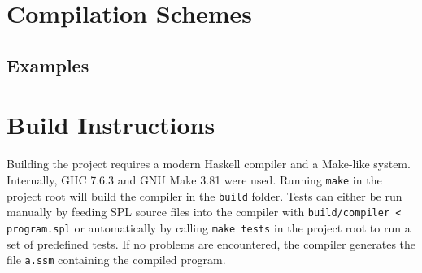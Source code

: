 \documentclass[a4paper]{article}
\begin{document}
\section{Compilation Schemes}


\subsection{Examples}


\section{Build Instructions}

Building the project requires a modern Haskell compiler and a Make-like system.
Internally, GHC 7.6.3 and GNU Make 3.81 were used.
Running \verb|make| in the project root will build the compiler in the \verb|build| folder.
Tests can either be run manually by feeding SPL source files into the compiler with \verb|build/compiler < program.spl| or automatically by calling \verb|make tests| in the project root to run a set of predefined tests.
If no problems are encountered, the compiler generates the file \verb|a.ssm| containing the compiled program.
\end{document}
